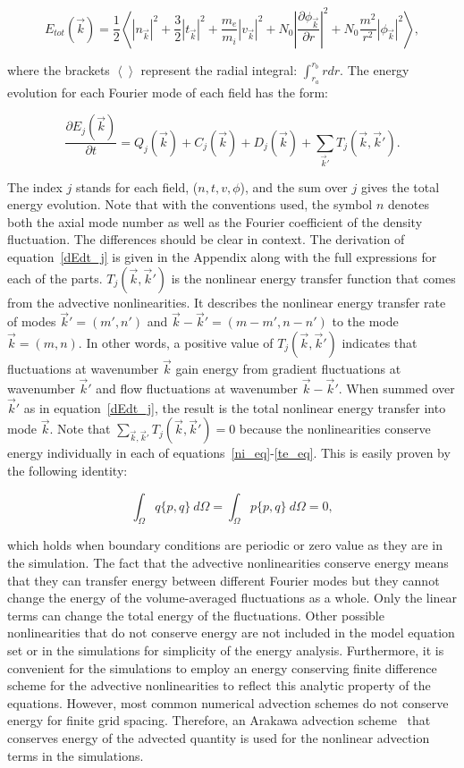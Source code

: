 \documentclass[showpacs,preprintnumbers,amsmath,amssymb,superscriptaddress,aip]{revtex4-1}
\def\beq{\begin{equation}}
\def\eeq{\end{equation}}
\newcommand{\pdiff}[2]{\frac{\partial#1}{\partial#2}}
\begin{document}
\beq
\label{E_k}
E_{tot}(\vec{k}) = \frac{1}{2} \left< |n_{\vec{k}}|^2 + \frac{3}{2} |t_{\vec{k}}|^2 + \frac{m_e}{m_i} |v_{\vec{k}}|^2 + N_0 \left| \pdiff{\phi_{\vec{k}}}{r} \right|^2 + N_0 \frac{m^2}{r^2} |\phi_{\vec{k}}|^2 \right>,
\eeq

where the brackets $\left< \right>$ represent the radial integral: $\int_{r_a}^{r_b} r dr$. 
The energy evolution for each Fourier mode of each field has the form:

\beq
\label{dEdt_j}
\pdiff{E_{j}(\vec{k})}{t} = Q_{j}(\vec{k}) + C_{j}(\vec{k}) + D_j(\vec{k}) + \sum_{\vec{k}'} T_{j}(\vec{k},\vec{k}').
\eeq

The index $j$ stands for each field, ($n,t,v,\phi$), and the sum over $j$ gives the total energy evolution. 
Note that with the conventions used, the symbol $n$ denotes both the axial mode number as
well as the Fourier coefficient of the density fluctuation. The differences should be clear in context. The derivation of equation~\ref{dEdt_j} 
is given in the Appendix along with the full expressions for each of the parts. $T_{j}(\vec{k},\vec{k}')$ is the nonlinear energy transfer function that comes from the advective
nonlinearities.  It describes the nonlinear energy transfer rate of modes $\vec{k}'=(m',n')$ and $\vec{k}-\vec{k}'=(m-m',n-n')$ to the mode $\vec{k}=(m,n)$. 
In other words, a positive value of $T_{j}(\vec{k},\vec{k}')$ indicates that fluctuations
at wavenumber $\vec{k}$ gain energy from gradient fluctuations at wavenumber $\vec{k}'$ and flow fluctuations at wavenumber $\vec{k}-\vec{k}'$.
When summed over $\vec{k}'$ as in equation~\ref{dEdt_j}, the result is the total
nonlinear energy transfer into mode $\vec{k}$. 
Note that $\sum_{\vec{k},\vec{k}'} T_{j}(\vec{k},\vec{k}') = 0$ because the nonlinearities conserve energy individually in each of equations~\ref{ni_eq}-\ref{te_eq}.
This is easily proven by the following identity:

\beq
\label{poisson_rln}
\int_\Omega q \{p,q\} \ d\Omega = \int_\Omega p \{p,q\} \ d\Omega = 0,
\eeq

which holds when boundary conditions are periodic or zero value as they are in the simulation. 
The fact that the advective nonlinearities conserve energy means that they can transfer energy between different Fourier modes
but they cannot change the energy of the volume-averaged fluctuations
as a whole. Only the linear terms can change the total energy of the fluctuations.
Other possible nonlinearities that do not conserve energy are not
included in the model equation set or in the simulations for simplicity of the energy analysis. 
Furthermore, it is convenient for the simulations to employ an energy conserving finite difference
scheme for the advective nonlinearities to reflect this analytic property of the equations. 
However, most common numerical advection schemes do not conserve energy for finite grid spacing. Therefore, an Arakawa advection scheme~\cite{arakawa1966} that conserves 
energy of the advected quantity is used for the nonlinear advection terms in the simulations.
\end{document}
